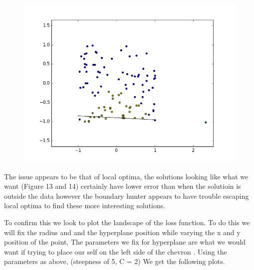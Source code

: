 \documentclass{article}
\theoremstyle{definition}
\begin{document}
\begin{figure}[H]
  \centering
  \begin{minipage}[b]{0.5\textwidth}
    \includegraphics[width=\textwidth]{BoundaryHunter-Attempt3-R2.png}
    \caption{}
  \end{minipage}
  \hfill
\end{figure}

The issue appears to be that of local optima, the solutions looking like what we want (Figure 13 and 14) certainly have lower error than when the solutioin is outside the data however the boundary hunter appears to have trouble escaping local optima to find these more interesting solutions.

To confirm this we look to plot the landscape of the loss function. To do this we will fix the radius and and the hyperplane position while varying the x and y position of the point, The parameters we fix for hyperplane are what we would want if trying to place our self on the left side of the chevron . Using the parameters as above, (steepness of 5, C = 2) We get the following plots.
\end{document}
